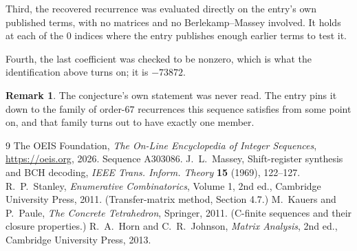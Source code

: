\documentclass[11pt,a4paper]{article}
\theoremstyle{plain}
\theoremstyle{definition}
\newtheorem{remark}[theorem]{Remark}
\begin{document}
Third, the recovered recurrence was evaluated directly on the entry's own published terms, with
no matrices and no Berlekamp--Massey involved. It holds at each of the $0$ indices where
the entry publishes enough earlier terms to test it.

Fourth, the last coefficient was checked to be nonzero, which is what the identification above
turns on; it is $-73872$.

\begin{remark}
The conjecture's own statement was never read. The entry pins it down to the family of
order-$67$ recurrences this sequence satisfies from some point on, and that family turns
out to have exactly one member.
\end{remark}

\begin{thebibliography}{9}
 The OEIS Foundation, \emph{The On-Line Encyclopedia of Integer
Sequences}, \url{https://oeis.org}, 2026. Sequence A303086.
 J.~L.~Massey, Shift-register synthesis and BCH decoding, \emph{IEEE
Trans. Inform. Theory} \textbf{15} (1969), 122--127.
 R.~P.~Stanley, \emph{Enumerative Combinatorics}, Volume 1, 2nd ed.,
Cambridge University Press, 2011. (Transfer-matrix method, Section 4.7.)
 M.~Kauers and P.~Paule, \emph{The Concrete Tetrahedron}, Springer, 2011.
(C-finite sequences and their closure properties.)
 R.~A.~Horn and C.~R.~Johnson, \emph{Matrix Analysis}, 2nd ed., Cambridge
University Press, 2013.
\end{thebibliography}
\end{document}
